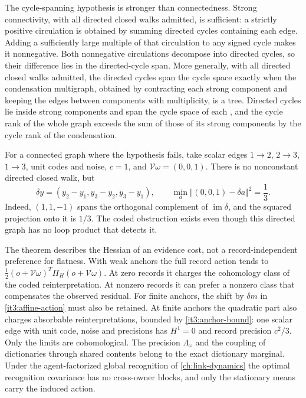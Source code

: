 The cycle-spanning hypothesis is stronger than connectedness. Strong connectivity, with all directed closed walks admitted, is sufficient: a strictly positive circulation is obtained by summing directed cycles containing each edge. Adding a sufficiently large multiple of that circulation to any signed cycle makes it nonnegative. Both nonnegative circulations decompose into directed cycles, so their difference lies in the directed-cycle span. More generally, with all directed closed walks admitted, the directed cycles span the cycle space exactly when the condensation multigraph, obtained by contracting each strong component and keeping the edges between components with multiplicity, is a tree. Directed cycles lie inside strong components and span the cycle space of each \citep{GleissLeydoldStadler2003}, and the cycle rank of the whole graph exceeds the sum of those of its strong components by the cycle rank of the condensation.

For a connected graph where the hypothesis fails, take scalar edges $1\to2$, $2\to3$, $1\to3$, unit codes and noise, $c=1$, and $\mathcal V\omega=(0,0,1)$. There is no nonconstant directed closed walk, but
\begin{equation}
\delta y=(y_2-y_1,y_3-y_2,y_3-y_1),\qquad
\min_a\Vert(0,0,1)-\delta a\Vert^2=\frac13.
\label{it3:dag-example}
\end{equation}
Indeed, $(1,1,-1)$ spans the orthogonal complement of $\operatorname{im}\delta$, and the squared projection onto it is $1/3$. The coded obstruction exists even though this directed graph has no loop product that detects it.

The theorem describes the Hessian of an evidence cost, not a record-independent preference for flatness. With weak anchors the full record action tends to
$\frac12(o+\mathcal V\omega)^T\Pi_H(o+\mathcal V\omega)$.
At zero records it charges the cohomology class of the coded reinterpretation. At nonzero records it can prefer a nonzero class that compensates the observed residual. For finite anchors, the shift by $\delta m$ in \cref{it3:affine-action} must also be retained. At finite anchors the quadratic part also charges absorbable reinterpretations, bounded by \cref{it3:anchor-bound}: one scalar edge with unit code, noise and precisions has $H^1=0$ and record precision $c^2/3$. Only the limits are cohomological. The precision $\Lambda_\omega$ and the coupling of dictionaries through shared contents belong to the exact dictionary marginal. Under the agent-factorized global recognition of \cref{ch:link-dynamics} the optimal recognition covariance has no cross-owner blocks, and only the stationary means carry the induced action.

